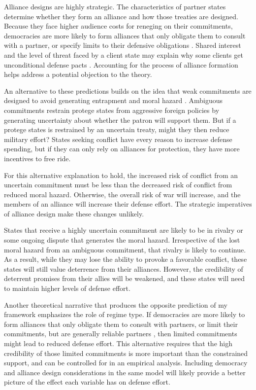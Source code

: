 \documentclass[12pt]{article}
\begin{document}
Alliance designs are highly strategic. The characteristics of partner states determine whether they form an alliance and how those treaties are designed. Because they face higher audience costs for reneging on their commitments, democracies are more likely to form alliances that only obligate them to consult with a partner, or specify limits to their defensive obligations \citep{Chibaetal2015}. Shared interest and the level of threat faced by a client state may explain why some clients get unconditional defense pacts \citep{Yarhi-Miloetal2016}. Accounting for the process of alliance formation helps address a potential objection to the theory.

An alternative to these predictions builds on the idea that weak commitments are designed to avoid generating entrapment and moral hazard \citep{Benson2012}. Ambiguous commitments restrain protege states from aggressive foreign policies by generating uncertainty about whether the patron will support them. But if a protege states is restrained by an uncertain treaty, might they then reduce military effort? States seeking conflict have every reason to increase defense spending, but if they can only rely on alliances for protection, they have more incentives to free ride. 

For this alternative explanation to hold, the increased risk of conflict from an uncertain commitment must be less than the decreased risk of conflict from reduced moral hazard. Otherwise, the overall risk of war will increase, and the members of an alliance will increase their defense effort. The strategic imperatives of alliance design make these changes unlikely. 

States that receive a highly uncertain commitment are likely to be in rivalry or some ongoing dispute that generates the moral hazard. Irrespective of the lost moral hazard from an ambiguous commitment, that rivalry is likely to continue. As a result, while they may lose the ability to provoke a favorable conflict, these states will still value deterrence from their alliances. However, the credibility of deterrent promises from their allies will be weakened, and these states will need to maintain higher levels of defense effort.

Another theoretical narrative that produces the opposite prediction of my framework emphasizes the role of regime type. If democracies are more likely to form alliances that only obligate them to consult with partners, or limit their commitments, but are generally reliable partners \citep{Chibaetal2015, DigiuseppePoast2016}, then limited commitments might lead to reduced defense effort. This alternative requires that the high credibility of those limited commitments is more important than the constrained support, and can be controlled for in an empirical analysis. Including democracy and alliance design considerations in the same model will likely provide a better picture of the effect each variable has on defense effort. 
\end{document}
